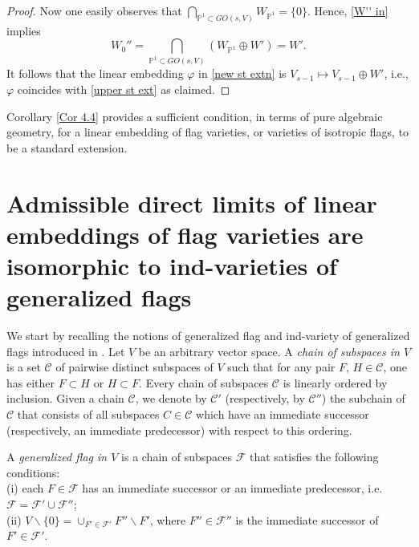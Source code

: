 \documentclass[12pt]{amsart}
\renewcommand{\phi}{\varphi}
\theoremstyle{definition}
\begin{document}
\begin{proof}
Now one easily observes that $\underset{\mathbb{P}^1\subset 
GO(s,V)}{\bigcap}W_{\mathbb{P}^1}=\{0\}$. Hence, \eqref{W'' in}
implies $$W_0''=\underset{\mathbb{P}^1\subset GO(s,V)}{\bigcap}
(W_{\mathbb{P}^1}\oplus W')=W'.$$ It follows that the linear
embedding $\phi$ in \eqref{new st extn} is $V_{s-1}\mapsto 
V_{s-1}\oplus W'$, i.e., $\phi$ coincides with 
\eqref{upper st ext} as claimed.
\end{proof}


Corollary \ref{Cor 4.4} provides a sufficient condition, in 
terms of pure algebraic geometry, for a linear embedding of
flag varieties, or varieties of isotropic flags, to be a
standard extension. 











\vspace{1cm}
\section{Admissible direct limits of linear embeddings of flag varieties are isomorphic to ind-varieties of generalized flags}
\label{ind-var}
\vspace{5mm}

We start by recalling the notions of generalized flag and  
ind-variety of generalized flags introduced in 
\cite[Section 5]{DP}. 
Let $V$ be an arbitrary vector space. A {\it chain of 
subspaces in $V$} is a set $\mathcal{C}$ of pairwise distinct 
subspaces of $V$ such that for any pair $F$, $H\in\mathcal{C}
$, one has either $F\subset H$ or $H\subset F$. Every chain of 
subspaces $\mathcal{C}$ is linearly ordered by inclusion. 
Given a chain $\mathcal{C}$, we denote by $\mathcal{C}'$ 
(respectively, by $\mathcal{C}''$) the subchain of 
$\mathcal{C}$ that consists of all subspaces $C \in 
\mathcal{C}$ which have an immediate successor (respectively, 
an immediate predecessor) with respect to this ordering. 

A {\it generalized flag in $V$} is a chain of subspaces 
$\mathcal{F}$ that satisfies the following conditions: \\
(i) each $F\in\mathcal{F}$ has an immediate successor or an 
immediate predecessor, i.e. $\mathcal{F}=\mathcal{F}'\cup
\mathcal{F}''$; \\
(ii) $V\backslash\{0\}=\cup_{F'\in\mathcal{F}'} F''\backslash 
F'$, where $F''\in\mathcal{F}''$ is the immediate successor of 
$F'\in \mathcal{F}'$.
\end{document}
